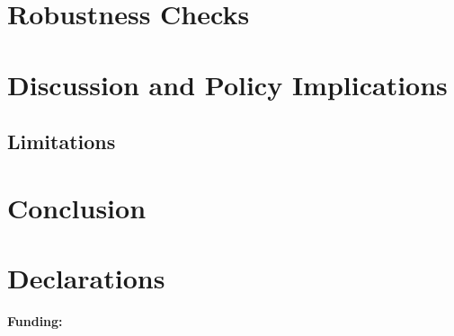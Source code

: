 \documentclass[11pt,a4paper]{article}
\begin{document}
\section{Robustness Checks}
\label{sec:robust}

\section{Discussion and Policy Implications}
\label{sec:discussion}

\subsection{Limitations}

\section{Conclusion}
\label{sec:conclusion}

\section*{Declarations}

\noindent\textbf{Funding:} %
\end{document}

